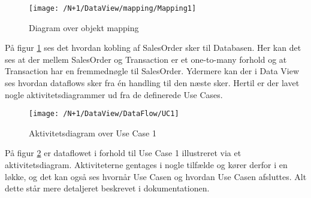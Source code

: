 \begin{figure}[H]
	\centering
	\texttt{[image: /N+1/DataView/mapping/Mapping1]}
	\caption{Diagram over objekt mapping}
	\label{MapDia}
\end{figure}	

På figur \ref{MapDia} ses det hvordan kobling af SalesOrder sker til Databasen. Her kan det ses at der mellem SalesOrder og Transaction er et one-to-many forhold og at Transaction har en fremmednøgle til SalesOrder.\newline\newline
Ydermere kan der i Data View ses hvordan dataflows sker fra én handling til den næste sker. Hertil er der lavet nogle aktivitetsdiagrammer ud fra de definerede Use Cases. 


\begin{figure}[H]
	\centering
	\texttt{[image: /N+1/DataView/DataFlow/UC1]}
	\caption{Aktivitetsdiagram over Use Case 1}	
	\label{AktDia}
\end{figure}

På figur \ref{AktDia} er dataflowet i forhold til Use Case 1 illustreret via et aktivitetsdiagram. Aktiviteterne gentages i nogle tilfælde og kører derfor i en løkke, og det kan også ses hvornår Use Casen og hvordan Use Casen afsluttes. Alt dette står mere detaljeret beskrevet i dokumentationen. 

 
 
  

